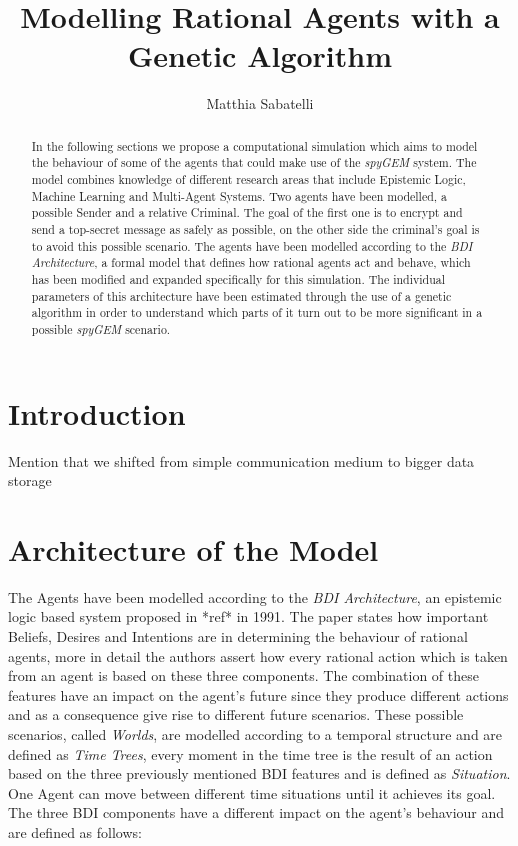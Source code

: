 \documentclass[a4paper]{article}
\begin{document}
\title {Modelling Rational Agents with a Genetic Algorithm}
\author{Matthia Sabatelli}

\pagestyle{empty}
\maketitle


\thispagestyle{empty}
\begin{abstract}

In the following sections we propose a computational simulation which aims to model the behaviour of some of the agents that could make use of the \textit{spyGEM} system. The model combines knowledge of different research areas that include Epistemic Logic, Machine Learning and Multi-Agent Systems. Two agents have been modelled, a possible Sender and a relative Criminal. The goal of the first one is to encrypt and send a top-secret message as safely as possible, on the other side the criminal's goal is to avoid this possible scenario. The agents have been modelled according to the \textit{BDI Architecture}, a formal model that defines how rational agents act and behave, which has been modified and expanded specifically for this simulation. The individual parameters of this architecture have been estimated through the use of a genetic algorithm in order to understand which parts of it turn out to be more significant in a possible \textit{spyGEM} scenario.        

\end{abstract}

\section{Introduction}

Mention that we shifted from simple communication medium to bigger data storage

\section{Architecture of the Model}

The Agents have been modelled according to the \textit{BDI Architecture}, an epistemic logic based system proposed in *ref* in 1991. The paper states how important Beliefs, Desires and Intentions are in determining the behaviour of rational agents, more in detail the authors assert how every rational action which is taken from an agent is based on these three components. The combination of these features have an impact on the agent's future since they produce different actions and as a consequence give rise to different future scenarios. These possible scenarios, called \textit{Worlds}, are modelled according to a temporal structure and are defined as \textit{Time Trees}, every moment in the time tree is the result of an action based on the three previously mentioned BDI features and is defined as \textit{Situation}. One Agent can move between different time situations until it achieves its goal. The three BDI components have a different impact on the agent's behaviour and are defined as follows: 
\end{document}
